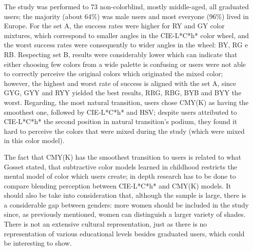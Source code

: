 \documentclass{report}
\begin{document}
The study was performed to 73 non-colorblind, mostly middle-aged, all graduated users; the majority
(about 64\%) was male users and most everyone (96\%) lived in Europe. For the set A, the success rates
were higher for RY and GY color mixtures, which correspond to smaller angles in the CIE-L*C*h* color wheel,
and the worst success rates were consequently to wider angles in the wheel: BY, RG e RB.
Respecting set B, results were considerably lower which can indicate that either choosing few colors from
a wide palette is confusing or users were not able to correctly perceive the original colors which originated
the mixed color; however, the highest and worst rate of success is aligned with the set A, since GYG, GYY
and RYY yielded the best results, RRG, RBG, BYB and BYY the worst. Regarding, the most natural transition,
users chose CMY(K) as having the smoothest one, followed by CIE-L*C*h* and HSV; despite users attributed to
CIE-L*C*h* the second position in natural transition’s podium, they found it hard to perceive the colors
that were mixed during the study (which were mixed in this color model). \par
The fact that CMY(K) has the smoothest transition to users is related to what Gosset \cite{Gossett2004} stated, that
subtractive color models learned in childhood restricts the mental model of color which users create;
in depth research has to be done to compare blending perception between CIE-L*C*h* and CMY(K) models. It 
should also be take into consideration that, although the sample is large, there is a considerable gap
between genders: more women should be included in the study since, as previously mentioned, women can 
distinguish a larger variety of shades. There is not an extensive cultural representation, just as there
is no representation of various educational levels besides graduated users, which could be interesting to show. \par
%
\end{document}
